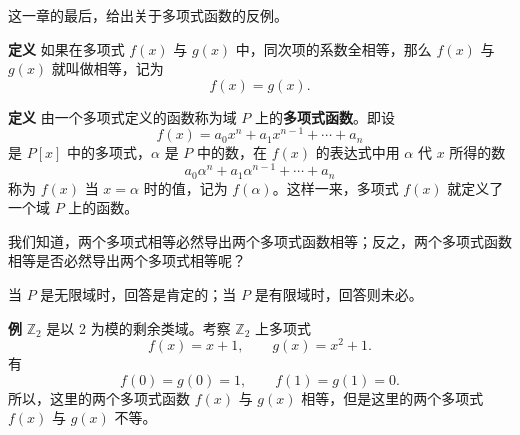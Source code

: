这一章的最后，给出关于多项式函数的反例。

\textbf{定义} 如果在多项式 $f(x)$ 与 $g(x)$ 中，同次项的系数全相等，那么 $f(x)$ 与 $g(x)$ 就叫做相等，记为
\[
 f(x)=g(x).
\]

\textbf{定义} 由一个多项式定义的函数称为域 $P$ 上的\textbf{多项式函数}。即设
\[
 f(x)=a_0x^n+a_1x^{n-1}+\cdots+a_n
\]
是 $P[x]$ 中的多项式，$\alpha$ 是 $P$ 中的数，在 $f(x)$ 的表达式中用 $\alpha$ 代 $x$ 所得的数
\[
 a_0\alpha^n+a_1\alpha^{n-1}+\cdots+a_n
\]
称为 $f(x)$ 当 $x=\alpha$ 时的值，记为 $f(\alpha)$。这样一来，多项式 $f(x)$ 就定义了一个域 $P$ 上的函数。

我们知道，两个多项式相等必然导出两个多项式函数相等；反之，两个多项式函数相等是否必然导出两个多项式相等呢？

当 $P$ 是无限域时，回答是肯定的；当 $P$ 是有限域时，回答则未必。

\textbf{例} $\mathbb Z_2$ 是以 2 为模的剩余类域。考察 $\mathbb Z_2$ 上多项式
\[
 f(x)=x+1,
 \qquad
 g(x)=x^2+1.
\]
有
\[
 f(0)=g(0)=1,
 \qquad
 f(1)=g(1)=0.
\]
所以，这里的两个多项式函数 $f(x)$ 与 $g(x)$ 相等，但是这里的两个多项式 $f(x)$ 与 $g(x)$ 不等。

